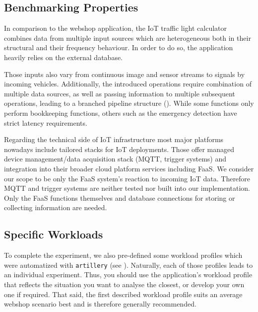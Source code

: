 \documentclass[../main.tex]{subfiles}
\begin{document}
\subsection{Benchmarking Properties}\label{ssec:iotApplicationProperties}

In comparison to the webshop application, the IoT traffic light calculator combines data from multiple input sources
which are heterogeneous both in their structural and their frequency behaviour. 
In order to do so, the application heavily relies on the external database.

Those inputs also vary from continuous image and sensor streams to signals by incoming vehicles. 
Additionally, the introduced operations require combination of multiple data sources, 
as well as passing information to multiple subsequent operations, 
leading to a branched pipeline structure (). %
While some functions only perform bookkeeping functions, others such as the emergency detection have strict latency requirements.

Regarding the technical side of IoT infrastructure most major platforms nowadays include tailored stacks for IoT deployments\footnotemark.
Those offer managed device management/data acquisition stack (MQTT, trigger systems)
and integration into their broader cloud platform services including FaaS.
We consider our scope to be only the FaaS system's reaction to incoming IoT data. 
Therefore MQTT and trigger systems are neither tested nor built into our implementation. 
Only the FaaS functions themselves and database connections for storing or collecting information are needed.


\subsection{Specific Workloads}\label{ssec:iotSpecificWorkloads}

To complete the experiment, we also pre-defined some workload profiles which were automatized with \texttt{artillery}
(see ).
Naturally, each of those profiles leads to an individual experiment.
Thus, you should use the application's workload profile that reflects the situation you want to analyse the closest,
or develop your own one if required.
That said, the first described workload profile suits an average webshop scenario best and is therefore generally recommended.
\end{document}
